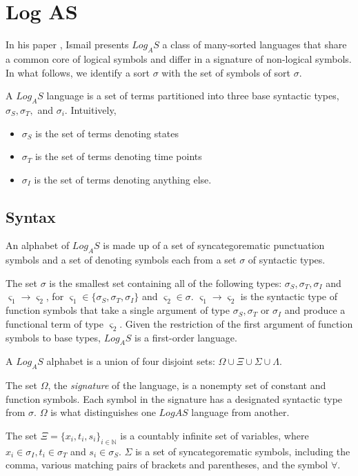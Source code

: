 \chapter{Log AS}

In his paper \cite{ismail2013stability}, Ismail presents
$Log_AS$ a class of many-sorted languages that share a common core of logical symbols and differ in a signature of non-logical symbols. In what follows, we identify a sort $\sigma$ with
the set of symbols of sort $\sigma$.

A $Log_AS$ language is a set of terms partitioned into three base syntactic types, $\sigma_S , \sigma_T ,$
and $\sigma_i.$ Intuitively, 
\begin{itemize}
  \item $\sigma_S$ is the set of terms denoting states 
   \item $\sigma_T$ is the set of terms denoting time points 
   \item $\sigma_I$ is the set of terms denoting anything else.
\end{itemize}

\section{Syntax}
An alphabet of $Log_A S$ is made up of a set of syncategorematic punctuation symbols and a set of denoting symbols each from a set $\sigma$ of syntactic types.

The set $\sigma$ is the smallest set containing all of the following types: 
$\sigma_S, \sigma_T, \sigma_I$ and $\varsigma_1 \to \varsigma_2$, 
for $\varsigma_1 \in \{\sigma_S, \sigma_T, \sigma_I \}$ and $\varsigma_2 \in \sigma$.
$\varsigma_1 \to \varsigma_2$ is the syntactic type of function symbols that take a single
argument of type $\sigma_S, \sigma_T$ or $\sigma_I$ and produce a functional
term of type $\varsigma_2$.
Given the restriction of the first argument of function symbols to base types, $Log_A S$ is a first-order language.


A $Log_A S$ alphabet is a union of four disjoint sets:
$ \Omega \cup \Xi \cup \Sigma \cup \Lambda$.

The set $\Omega$, the \textit{signature} of the language, is a nonempty set of constant and function symbols. Each symbol in the signature has a designated syntactic type from $\sigma$. $\Omega$  is
what distinguishes one $LogA S$ language from another.

The set $\Xi = \{x_i, t_i, s_i\}_{i \in \mathbb{N}}$ is a countably infinite set of variables, where$x_i \in \sigma_I, t_i \in \sigma_T$ and $s_i \in \sigma_S$. $\Sigma$ is a set
of syncategorematic symbols, including the comma, various
matching pairs of brackets and parentheses, and the symbol $\forall$.

